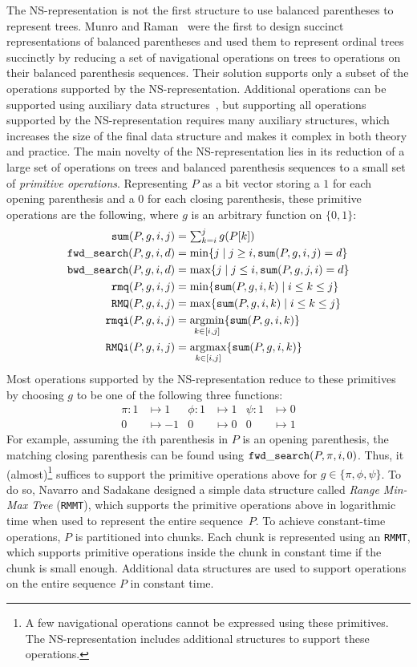 The NS-representa\-tion is not the first structure to use balanced
parentheses to represent trees.  Munro and Raman~\cite{mr1997} were
the first to design succinct representations of balanced parentheses
and used them to represent ordinal trees succinctly by reducing a set
of navigational operations on trees to operations on their balanced
parenthesis sequences.  Their solution supports only a subset of the
operations supported by the NS-representation.  Additional operations
can be supported using auxiliary data structures~\cite{ly2008}, but
supporting all operations supported by the NS-representation requires many
auxiliary structures, which increases the size of the final data structure
and makes it complex in both theory and practice.  The main novelty of
the NS-representation lies in its reduction of a large set of
operations on trees and balanced parenthesis sequences to a small set
of \emph{primitive operations}.  Representing $P$ as a bit vector
storing a $1$ for each opening parenthesis and a $0$ for each closing
parenthesis, these primitive operations are the following, where $g$ is an
arbitrary function on $\{0,1\}$:
\begin{align*}
  \mathtt{sum}(P,g,i,j) &= \textstyle\sum_{k=i}^jg(P[k])\\
  \mathtt{fwd\_search}(P,g,i,d) &= \min\{j \mid j \ge i, \mathtt{sum}(P,g,i,j) = d\}\\
  \mathtt{bwd\_search}(P,g,i,d) &= \max\{j \mid j \le i, \mathtt{sum}(P,g,j,i) = d\}\\
  \mathtt{rmq}(P,g,i,j) &= \min\{\mathtt{sum}(P,g,i,k) \mid i\le k\le j\}\\
  \mathtt{RMQ}(P,g,i,j) &= \max\{\mathtt{sum}(P,g,i,k) \mid i\le k\le j\}\\
  \mathtt{rmqi}(P,g,i,j) &= \operatorname*{arg\!\min}_{k\in[i,j]}\{\mathtt{sum}(P,g,i,k)\}\\
  \mathtt{RMQi}(P,g,i,j) &= \operatorname*{arg\!\max}_{k\in[i,j]}\{\mathtt{sum}(P,g,i,k)\}
\end{align*}
Most operations supported by the NS-representation reduce to these primitives
by choosing $g$ to be one of the following three functions:
\begin{align*}
  \pi : 1 &\mapsto 1 &\phi : 1 &\mapsto 1 & \psi : 1 &\mapsto 0\\
  0 &\mapsto -1 & 0 &\mapsto 0 & 0 &\mapsto 1
\end{align*}
For example, assuming the $i$th parenthesis in $P$ is an opening parenthesis,
the matching closing parenthesis can be found using
$\mathtt{fwd\_search}(P,\pi,i,0)$.  Thus, it (almost)\footnote{A few
  navigational operations cannot be expressed using these primitives.
  The NS-representation includes additional structures to support
  these operations.} suffices to support the primitive operations above for
$g \in \{\pi, \phi, \psi\}$.  To do so, Navarro and Sadakane designed
a simple data structure called \emph{Range Min-Max Tree} ({\tt RMMT}),
which supports the primitive operations above in logarithmic time when used
to represent the entire sequence~$P$.  To achieve constant-time
operations, $P$ is partitioned into chunks.  Each chunk is represented
using an {\tt RMMT}, which supports primitive operations inside the
chunk in constant time if the chunk is small enough.  Additional data
structures are used to support operations on the entire sequence $P$
in constant time.

